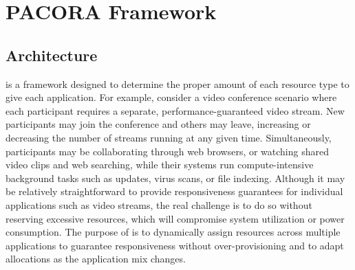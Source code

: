 \chapter{PACORA Framework}

\section{\pacora Architecture}\label{sys_design}




\pacora is a framework designed to determine the proper amount of each
resource type to give each application.  For example, consider a video
conference scenario where each participant requires a separate,
performance-guaranteed video stream.  New participants may join the
conference and others may leave, increasing or decreasing the number
of streams running at any given time.  Simultaneously, participants
may be collaborating through web browsers, or watching shared video
clips and web searching, while their systems run compute-intensive
background tasks such as updates, virus scans, or file indexing.
Although it may be relatively straightforward to provide
responsiveness guarantees for individual applications such as video
streams, the real challenge is to do so without reserving excessive
resources, which will compromise system utilization or power
consumption. The purpose of \pacora is to dynamically assign resources
across multiple applications to guarantee responsiveness without
over-provisioning and to adapt allocations as the application mix
changes.

